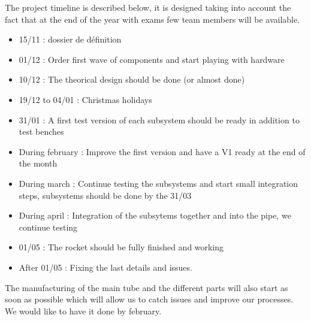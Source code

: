 The project timeline is described below, it is designed taking into account the fact that at the end of the year with exams few team members will be available.
\begin{itemize}
	\item 15/11 : dossier de définition
	\item 01/12 : Order first wave of components and start playing with hardware
	\item 10/12 : The theorical design should be done (or almost done)
	\item 19/12 to 04/01 : Christmas holidays
	\item 31/01 : A first test version of each subsystem should be ready in addition to test benches
	\item During february : Improve the first version and have a V1 ready at the end of the month
	\item During march : Continue testing the subsystems and start small integration steps, subsystems should be done by the 31/03
	\item During april : Integration of the subsytems together and into the pipe, we continue testing
	\item 01/05 : The rocket should be fully finished and working
	\item After 01/05 : Fixing the last details and issues.
\end{itemize}

The manufacturing of the main tube and the different parts will also start as soon as possible which will allow us to catch issues and improve our processes.
We would like to have it done by february.

